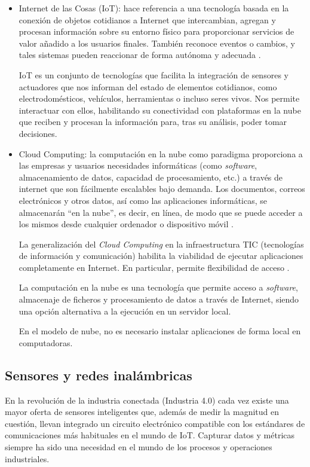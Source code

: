 \begin{itemize}
\item Internet de las Cosas (IoT): hace referencia a una tecnología basada en la conexión de objetos cotidianos a Internet que intercambian, agregan y procesan información sobre su entorno físico para proporcionar servicios de valor añadido a los usuarios finales. También reconoce eventos o cambios, y tales sistemas pueden reaccionar de forma autónoma y adecuada \citep{BOOK:1}.

IoT es un conjunto de tecnologías que facilita la integración de sensores y actuadores que nos informan del estado de elementos cotidianos, como electrodomésticos, vehículos, herramientas o incluso seres vivos. Nos permite interactuar con ellos, habilitando su conectividad con plataformas en la nube que reciben y procesan la información para, tras su análisis, poder tomar decisiones.

\item Cloud Computing: la computación en la nube como paradigma proporciona a las empresas y usuarios necesidades informáticas (como \emph{software}, almacenamiento de datos, capacidad de procesamiento, etc.) a través de internet que son fácilmente escalables bajo demanda. Los documentos, correos electrónicos y otros datos, así como las aplicaciones informáticas, se almacenarán ``en la nube'', es decir, en línea, de modo que se puede acceder a los mismos desde cualquier ordenador o dispositivo móvil \citep{BOOK:1}.

La generalización del \emph{Cloud Computing} en la infraestructura TIC (tecnologías de información y comunicación) habilita la viabilidad de ejecutar aplicaciones completamente en Internet. En particular, permite flexibilidad de acceso \citep{BOOK:1}.

La computación en la nube es una tecnología que permite acceso a \emph{software}, almacenaje de ficheros y procesamiento de datos a través de Internet, siendo una opción alternativa a la ejecución en un servidor local. 

En el modelo de nube, no es necesario instalar aplicaciones de forma local en computadoras.

\end{itemize}

\subsection{Sensores y redes inalámbricas}

En la revolución de la industria conectada (Industria 4.0) cada vez existe una mayor oferta de sensores inteligentes que, además de medir la magnitud en cuestión, llevan integrado un circuito electrónico compatible con los estándares de comunicaciones más habituales en el mundo de IoT. Capturar datos y métricas siempre ha sido una necesidad en el mundo de los procesos y operaciones industriales.

